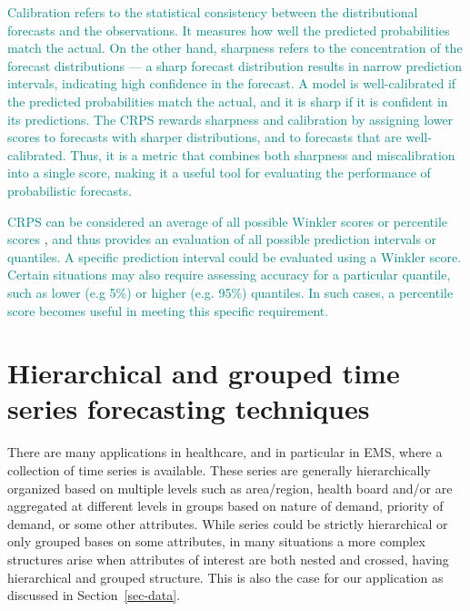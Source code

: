 \documentclass[
  authoryear,
  preprint,
  3p]{elsarticle}
\begin{document}
\textcolor{teal}{Calibration refers to the statistical consistency between the distributional forecasts and the observations. It measures how well the predicted probabilities match the actual. On the other hand, sharpness refers to the concentration of the forecast distributions --- a sharp forecast distribution results in narrow prediction intervals, indicating high confidence in the forecast. A model is well-calibrated if the predicted probabilities match the actual, and it is sharp if it is confident in its predictions. The CRPS rewards sharpness and calibration by assigning lower scores to forecasts with sharper distributions, and to forecasts that are well-calibrated. Thus, it is a metric that combines both sharpness and miscalibration into a single score, making it a useful tool for evaluating the performance of probabilistic forecasts.}

\textcolor{teal}{CRPS can be considered an average of all possible Winkler scores}
\citep[Section 5.9]{winkler1972decision, hyndman2021forecasting}
\textcolor{teal}{or percentile scores} \citep[section
5.9]{hyndman2021forecasting},
\textcolor{teal}{and thus provides an evaluation of all possible prediction intervals or quantiles.}
\textcolor{teal}{A specific prediction interval could be evaluated using a Winkler score. Certain situations may also require assessing accuracy for a particular quantile, such as lower (e.g 5\%) or higher (e.g. 95\%) quantiles. In such cases, a percentile score  becomes useful in meeting this specific requirement.}

\hypertarget{sec-htc}{%
\section{Hierarchical and grouped time series forecasting
techniques}\label{sec-htc}}

There are many applications in healthcare, and in particular in EMS,
where a collection of time series is available. These series are
generally hierarchically organized based on multiple levels such as
area/region, health board and/or are aggregated at different levels in
groups based on nature of demand, priority of demand, or some other
attributes. While series could be strictly hierarchical or only grouped
bases on some attributes, in many situations a more complex structures
arise when attributes of interest are both nested and crossed, having
hierarchical and grouped structure. This is also the case for our
application as discussed in Section~\ref{sec-data}.
\end{document}
